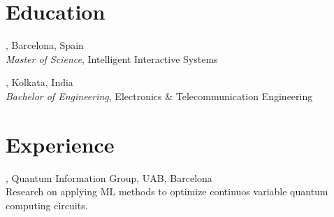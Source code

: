\documentclass[mm]{simple_style}
\begin{document}
\address{Kolkata, India}


\begin{resume}

\section{Education}
, Barcelona, Spain \\
{\it Master of Science}, Intelligent Interactive Systems\\

\vspace{-4ex}

, Kolkata, India \\
{\it Bachelor of Engineering}, Electronics \& Telecommunication Engineering\\
\sectionline



\section{Experience}


, Quantum Information Group, UAB, Barcelona \\
Research on applying ML methods to optimize continuos variable quantum computing circuits.\\

\vspace{-4.5ex}


\end{resume}
\end{document}
